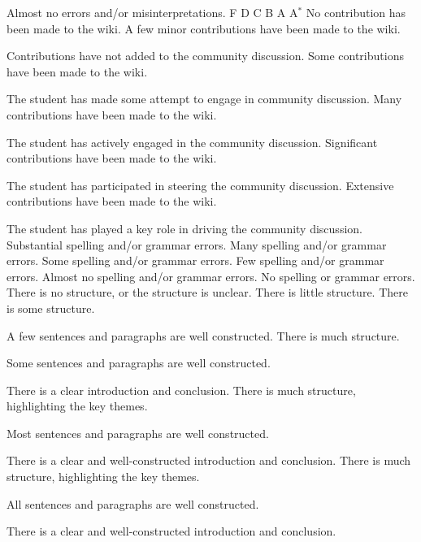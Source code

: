 \documentclass{../fal_assignment}
\begin{document}
\begin{markingrubric}
        \par 		Almost no errors and/or misinterpretations.
%
        \grade\fail F
        \grade		D
        \grade		C
        \grade		B
        \grade		A
        \grade		A$^*$
%
        \grade\fail 	No contribution has been made to the wiki.
        \grade 		A few minor contributions have been made to the wiki.
        \par		Contributions have not added to the community discussion.
        \grade 		Some contributions have been made to the wiki.
        \par		The student has made some attempt to engage in community discussion.
        \grade 		Many contributions have been made to the wiki.
        \par		The student has actively engaged in the community discussion.
        \grade 		Significant contributions have been made to the wiki.
        \par		The student has participated in steering the community discussion.
        \grade 		Extensive contributions have been made to the wiki.
        \par		The student has played a key role in driving the community discussion.
%
        \grade\fail 	Substantial spelling and/or grammar errors.
        \grade 		Many spelling and/or grammar errors.
        \grade 		Some spelling and/or grammar errors.  
        \grade 		Few spelling and/or grammar errors.
        \grade 		Almost no spelling and/or grammar errors.
        \grade 		No spelling or grammar errors.
%
        \grade\fail 	There is no structure, or the structure is unclear.
        \grade 		There is little structure.
        \grade 		There is some structure.
        \par 		A few sentences and paragraphs are well constructed.
        \grade 		There is much structure.
        \par 		Some sentences and paragraphs are well constructed.
        \par 		There is a clear introduction and conclusion.
        \grade 		There is much structure, highlighting the key themes.
        \par 		Most sentences and paragraphs are well constructed.
        \par 		There is a clear and well-constructed introduction and conclusion.
        \grade 		There is much structure, highlighting the key themes.
        \par 		All sentences and paragraphs are well constructed.
        \par 		There is a clear and well-constructed introduction and conclusion.
\end{markingrubric}
\end{document}
